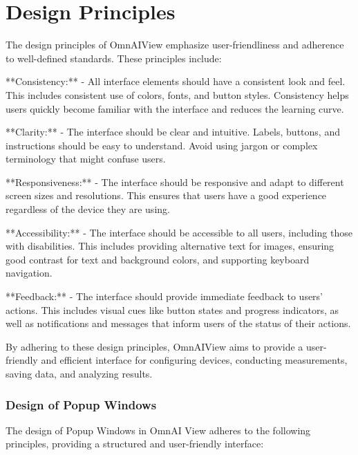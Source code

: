 \documentclass[]{scrreprt}
\begin{document}
\section{Design Principles} \label{cap:Designprinciples}

The design principles of OmnAIView emphasize user-friendliness and adherence to well-defined standards. These principles include:

**Consistency:**
- All interface elements should have a consistent look and feel. This includes consistent use of colors, fonts, and button styles. Consistency helps users quickly become familiar with the interface and reduces the learning curve.

**Clarity:**
- The interface should be clear and intuitive. Labels, buttons, and instructions should be easy to understand. Avoid using jargon or complex terminology that might confuse users.

**Responsiveness:**
- The interface should be responsive and adapt to different screen sizes and resolutions. This ensures that users have a good experience regardless of the device they are using.

**Accessibility:**
- The interface should be accessible to all users, including those with disabilities. This includes providing alternative text for images, ensuring good contrast for text and background colors, and supporting keyboard navigation.

**Feedback:**
- The interface should provide immediate feedback to users' actions. This includes visual cues like button states and progress indicators, as well as notifications and messages that inform users of the status of their actions.

By adhering to these design principles, OmnAIView aims to provide a user-friendly and efficient interface for configuring devices, conducting measurements, saving data, and analyzing results.

\subsubsection{Design of Popup Windows}

The design of Popup Windows in OmnAI View adheres to the following principles, providing a structured and user-friendly interface:
\end{document}
